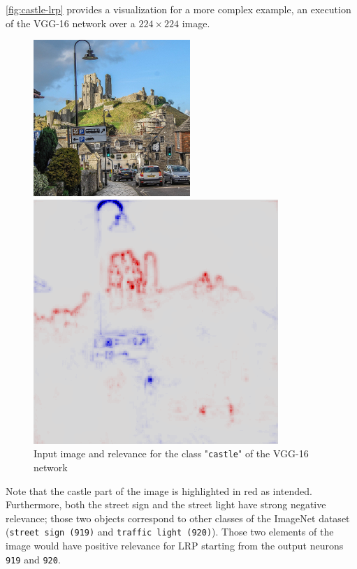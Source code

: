 \documentclass{../cs-classes/cs-classes}
\begin{document}
\autoref{fig:castle-lrp} provides a visualization for a more complex example, an execution of the VGG-16 network over a $224\times224$ image. 
\begin{figure}[H]
    \centering
    \begin{minipage}[c]{.49\textwidth}
        \centering
        \includegraphics[width=.65\textwidth]{castle.jpg}
    \end{minipage}
    \hspace*{-2.5cm}
    \begin{minipage}[c]{.49\textwidth}
        \centering
        \includegraphics[width=.65\textwidth]{castle-lrp.png}
    \end{minipage}
    \caption{Input image and relevance for the class "\texttt{castle}" of the VGG-16 network}
    \label{fig:castle-lrp}
\end{figure}
Note that the castle part of the image is highlighted in red as intended. Furthermore, both the street sign and the street light have strong negative relevance; those two objects correspond to other classes of the ImageNet dataset (\texttt{street sign (919)} and \texttt{traffic light (920)}). Those two elements of the image would have positive relevance for LRP starting from the output neurons \texttt{919} and \texttt{920}.
\end{document}
